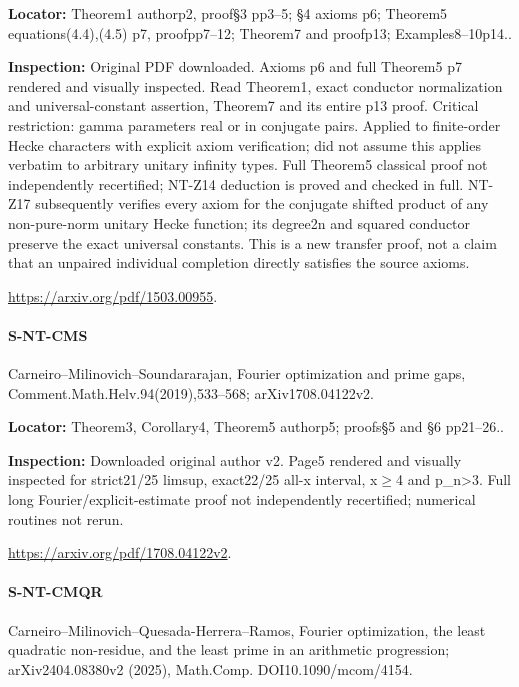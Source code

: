 \documentclass[11pt,a4paper]{article}
\begin{document}
\textbf{Locator:} Theorem1 authorp2, proof§3 pp3–\allowbreak{}5; §4 axioms p6; Theorem5 equations(4.\allowbreak{}4),(4.\allowbreak{}5) p7, proofpp7–\allowbreak{}12; Theorem7 and proofp13; Examples8–\allowbreak{}10p14.\allowbreak{}.

\textbf{Inspection:} Original PDF downloaded.\allowbreak{} Axioms p6 and full Theorem5 p7 rendered and visually inspected.\allowbreak{} Read Theorem1, exact conductor normalization and universal-constant assertion, Theorem7 and its entire p13 proof.\allowbreak{} Critical restriction:\allowbreak{} gamma parameters real or in conjugate pairs.\allowbreak{} Applied to finite-order Hecke characters with explicit axiom verification; did not assume this applies verbatim to arbitrary unitary infinity types.\allowbreak{} Full Theorem5 classical proof not independently recertified; NT-Z14 deduction is proved and checked in full.\allowbreak{} NT-Z17 subsequently verifies every axiom for the conjugate shifted product of any non-pure-norm unitary Hecke function; its degree2n and squared conductor preserve the exact universal constants.\allowbreak{} This is a new transfer proof, not a claim that an unpaired individual completion directly satisfies the source axioms.\allowbreak{}

\url{https://arxiv.org/pdf/1503.00955}.

\paragraph{S-NT-CMS} Carneiro–\allowbreak{}Milinovich–\allowbreak{}Soundararajan, Fourier optimization and prime gaps, Comment.\allowbreak{}Math.\allowbreak{}Helv.\allowbreak{}94(2019),533–\allowbreak{}568; arXiv1708.\allowbreak{}04122v2.

\textbf{Locator:} Theorem3, Corollary4, Theorem5 authorp5; proofs§5 and §6 pp21–\allowbreak{}26.\allowbreak{}.

\textbf{Inspection:} Downloaded original author v2.\allowbreak{} Page5 rendered and visually inspected for strict21/\allowbreak{}25 limsup, exact22/\allowbreak{}25 all-x interval, x\ensuremath{\ge}4 and p\_\allowbreak{}n>3.\allowbreak{} Full long Fourier/\allowbreak{}explicit-estimate proof not independently recertified; numerical routines not rerun.\allowbreak{}

\url{https://arxiv.org/pdf/1708.04122v2}.

\paragraph{S-NT-CMQR} Carneiro–\allowbreak{}Milinovich–\allowbreak{}Quesada-Herrera–\allowbreak{}Ramos, Fourier optimization, the least quadratic non-residue, and the least prime in an arithmetic progression; arXiv2404.\allowbreak{}08380v2 (2025), Math.\allowbreak{}Comp.\allowbreak{} DOI10.\allowbreak{}1090/\allowbreak{}mcom/\allowbreak{}4154.
\end{document}
